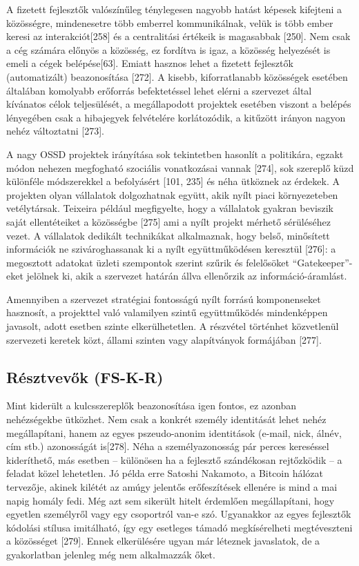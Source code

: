 \documentclass[12pt,magyar,a4paper,oneside]{scrreprt}
\begin{document}
A fizetett fejlesztők valószínűleg ténylegesen nagyobb hatást képesek
kifejteni a közösségre, mindenesetre több emberrel kommunikálnak, velük
is több ember keresi az interakciót{[}258{]} és a centralitási értékeik
is magasabbak {[}250{]}. Nem csak a cég számára előnyös a közösség, ez
fordítva is igaz, a közösség helyezését is emeli a cégek
belépése{[}63{]}. Emiatt hasznos lehet a fizetett fejlesztők
(automatizált) beazonosítása {[}272{]}. A kisebb, kiforratlanabb
közösségek esetében általában komolyabb erőforrás befektetéssel lehet
elérni a szervezet által kívánatos célok teljesülését, a megállapodott
projektek esetében viszont a belépés lényegében csak a hibajegyek
felvételére korlátozódik, a kitűzött irányon nagyon nehéz változtatni
{[}273{]}.

A nagy OSSD projektek irányítása sok tekintetben hasonlít a politikára,
egzakt módon nehezen megfogható szociális vonatkozásai vannak {[}274{]},
sok szereplő küzd különféle módszerekkel a befolyásért {[}101, 235{]} és
néha ütköznek az érdekek. A projekten olyan vállalatok dolgozhatnak
együtt, akik nyílt piaci környezeteben vetélytársak. Teixeira például
megfigyelte, hogy a vállalatok gyakran beviszik saját ellentéteiket a
közösségbe {[}275{]} ami a nyílt projekt mérhető sérüléséhez vezet. A
vállalatok dedikált technikákat alkalmaznak, hogy belső, minősített
információk ne szivároghassanak ki a nyílt együttműködésen keresztül
{[}276{]}: a megosztott adatokat üzleti szempontok szerint szűrik és
felelősöket ``Gatekeeper''-eket jelölnek ki, akik a szervezet határán
állva ellenőrzik az információ-áramlást.

Amennyiben a szervezet stratégiai fontosságú nyílt forrású komponenseket
hasznosít, a projekttel való valamilyen szintű együttműködés
mindenképpen javasolt, adott esetben szinte elkerülhetetlen. A részvétel
történhet közvetlenül szervezeti keretek közt, állami szinten vagy
alapítványok formájában {[}277{]}.

\hypertarget{sec:FS-K-R}{%
\subsection{Résztvevők (FS-K-R)}\label{sec:FS-K-R}}

Mint kiderült a kulcsszereplők beazonosítása igen fontos, ez azonban
nehézségekbe ütközhet. Nem csak a konkrét személy identitását lehet
nehéz megállapítani, hanem az egyes pszeudo-anonim identitások (e-mail,
nick, álnév, cím stb.) azonosságát is{[}278{]}. Néha a személyazonosság
pár perces kereséssel kideríthető, más esetben -- különösen ha a
fejlesztő szándékosan rejtőzködik -- a feladat közel lehetetlen. Jó
példa erre Satoshi Nakamoto, a Bitcoin hálózat tervezője, akinek kilétét
az amúgy jelentős erőfeszítések ellenére is mind a mai napig homály
fedi. Még azt sem sikerült hitelt érdemlően megállapítani, hogy egyetlen
személyről vagy egy csoportról van-e szó. Ugyanakkor az egyes fejlesztők
kódolási stílusa imitálható, így egy esetleges támadó megkísérelheti
megtéveszteni a közösséget {[}279{]}. Ennek elkerülésére ugyan már
léteznek javaslatok, de a gyakorlatban jelenleg még nem alkalmazzák
őket.
\end{document}

